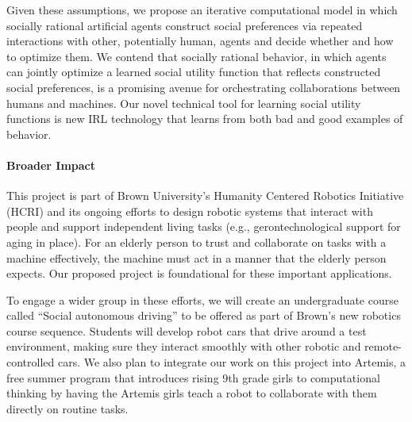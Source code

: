 Given these assumptions, we propose an iterative computational model
in which socially rational artificial agents construct social
preferences via repeated interactions with other, potentially human,
agents and decide whether and how to optimize them.
We contend that socially rational behavior, in which agents
can jointly optimize a learned social utility function that reflects
constructed social preferences, is a promising avenue for
orchestrating collaborations between humans and machines.
%
Our novel technical tool for learning social utility functions is
new IRL technology that learns from
both bad and good examples of behavior.  



\vspace{\up}
\paragraph{Broader Impact}
%
This project is part of Brown University's Humanity Centered
Robotics Initiative (HCRI) and its ongoing efforts to design robotic
systems that interact with people and support independent living tasks
(e.g., gerontechnological support for aging in place).  For an elderly
person to trust and collaborate on tasks with a machine effectively,
the machine must act in a manner that the elderly person expects.  Our
proposed project is foundational for these
important applications.

To engage a wider group in these efforts, 
we will create an undergraduate course called ``Social
autonomous driving'' to be offered as part of Brown's new robotics
course sequence.  Students
will develop robot cars that drive around a test environment, making sure they interact smoothly
with other robotic and remote-controlled cars.
We also plan to integrate our work on this project into Artemis, a
free summer program that introduces rising 9th grade girls to
computational thinking by having the Artemis girls
teach a robot to collaborate with them directly on routine tasks.

